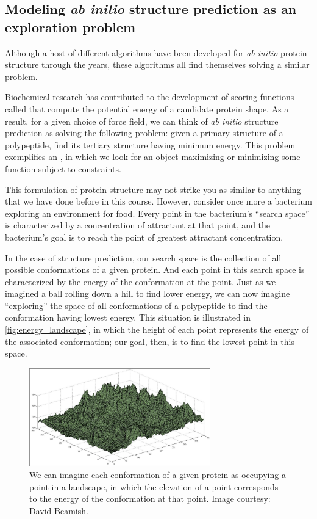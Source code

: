 \FloatBarrier
{}
\subsection{Modeling \textit{ab initio} structure prediction as an exploration problem}

Although a host of different algorithms have been developed for \textit{ab initio} protein structure through the years, these algorithms all find themselves solving a similar problem.

Biochemical research has contributed to the development of scoring functions called  that compute the potential energy of a candidate protein shape. As a result, for a given choice of force field, we can think of \textit{ab initio} structure prediction as solving the following problem: given a primary structure of a polypeptide, find its tertiary structure having minimum energy. This problem exemplifies an , in which we look for an object maximizing or minimizing some function subject to constraints.

This formulation of protein structure may not strike you as similar to anything that we have done before in this course. However, consider once more a bacterium exploring an environment for food. Every point in the bacterium's ``search space'' is characterized by a concentration of attractant at that point, and the bacterium's goal is to reach the point of greatest attractant concentration.

In the case of structure prediction, our search space is the collection of all possible conformations of a given protein. And each point in this search space is characterized by the energy of the conformation at the point. Just as we imagined a ball rolling down a hill to find lower energy, we can now imagine ``exploring'' the space of all conformations of a polypeptide to find the conformation having lowest energy. This situation is illustrated in \autoref{fig:energy_landscape}, in which the height of each point represents the energy of the associated conformation; our goal, then, is to find the lowest point in this space.

\begin{figure}[h]
	\centering
	\mySfFamily
	\includegraphics[width = 0.7\textwidth]{../images/energy_landscape.png}
	\caption{We can imagine each conformation of a given protein as occupying a point in a landscape, in which the elevation of a point corresponds to the energy of the conformation at that point. Image courtesy: David Beamish.}
	\label{fig:energy_landscape}
\end{figure}

